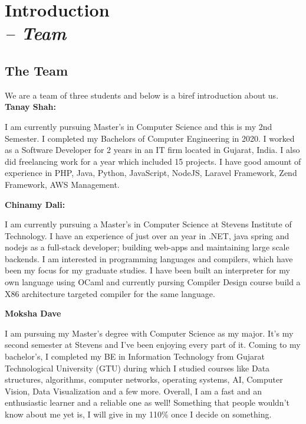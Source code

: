 \chapter{Introduction \\
\small{\textit{-- Team}} 
\label{Chapter::Introduction}}

\section{The Team \label{Section::The Team}}

We are a team of three students and below is a biref introduction about us.\\
\textbf{Tanay Shah:}

I am currently pursuing Master's in Computer Science and this is my 2nd Semester. I completed my Bachelors of Computer Engineering in 2020. I worked as a Software Developer for 2 years in an IT firm located in Gujarat, India. I also did freelancing work for a year which included 15 projects. I have good amount of experience in PHP, Java, Python, JavaScript, NodeJS, Laravel Framework, Zend Framework, AWS Management.

\textbf{Chinamy Dali:}

I am currently pursuing a Master's in Computer Science at Stevens Institute of Technology. I have an experience of just over an year in .NET, java spring and nodejs as a full-stack developer; building web-apps and maintaining large scale backends. I am interested in programming languages and compilers, which have been my focus for my graduate studies. I have been built an interpreter for my own language using OCaml and currently pursing Compiler Design course build a X86 architecture targeted compiler for the same language. 

\textbf{Moksha Dave}

I am pursuing my Master's degree with Computer Science as my major. It's my second semester at Stevens and I've been enjoying every part of it. Coming to my bachelor's, I completed my BE in Information Technology from Gujarat Technological University (GTU) during which I studied courses like Data structures, algorithms, computer networks, operating systems, AI, Computer Vision, Data Visualization and a few more. Overall, I am a fast and an enthusiastic learner and a reliable one as well! Something that people wouldn't know about me yet is, I will give in my 110\% once I decide on something.

